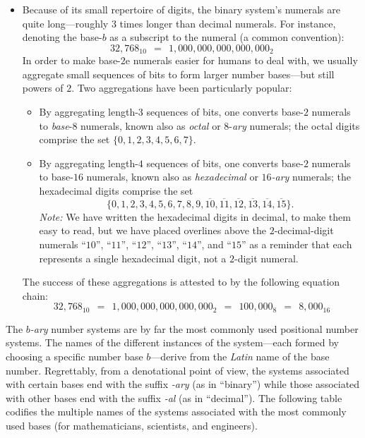 \begin{itemize}
\item
Because of its small repertoire of digits, the binary system's
numerals are quite long---roughly $3$ times longer than decimal
numerals.  For instance, denoting the base-$b$ as a subscript to the
numeral (a common convention):
\[ 32,768_{10} \ \ = \ \ 1,000,000,000,000,000_2 \]
In order to make base-$2$e numerals easier for humans to deal with, we
usually aggregate small sequences of bits to form larger number
bases---but still powers of $2$.  Two aggregations have been
particularly popular:
  \begin{itemize}
  \item
By aggregating length-$3$ sequences of bits, one converts base-$2$
numerals to {\it base}-$8$ numerals, known also as {\it octal} or
$8$-{\it ary} numerals;
 the octal digits comprise
the set $\{0, 1, 2, 3, 4, 5, 6, 7\}$.
  \item
By aggregating length-$4$ sequences of bits, one converts base-$2$
numerals to base-$16$ numerals, known also as {\it hexadecimal} or
{\it $16$-ary} numerals;  
the hexadecimal digits comprise the set 
\[ \{0, 1, 2, 3, 4, 5, 6, 7, 8, 9, \overline{10}, \overline{11},
\overline{12}, \overline{13}, \overline{14}, \overline{15}\}.
\]
{\it Note:} We have written the hexadecimal digits in decimal, to make
them easy to read, but we have placed overlines above the
$2$-decimal-digit numerals ``$10$'', ``$11$'', ``$12$'', ``$13$'',
``$14$'', and ``$15$'' as a reminder that each represents a single
hexadecimal digit, not a $2$-digit numeral.
  \end{itemize}
The success of these aggregations is attested to by the following
equation chain:
\[ 32,768_{10} \ \ = \ \ 1,000,000,000,000,000_2 \ \ = \ \
100,000_8 \ \ = \ \ 8,000_{16}
\]
\end{itemize}

\medskip

The {\it $b$-ary} number systems are by far the most commonly used
positional number systems.  The names of the different instances of
the system---each formed by choosing a specific number base
$b$---derive from the {\em Latin} name of the base number.
Regrettably, from a denotational point of view, the systems associated
with certain bases end with the suffix {\em -ary} (as in ``binary'')
while those associated with other bases end with the suffix {\em -al}
(as in ``decimal'').  The following table codifies the multiple names
of the systems associated with the most commonly used bases (for
mathematicians, scientists, and engineers).

